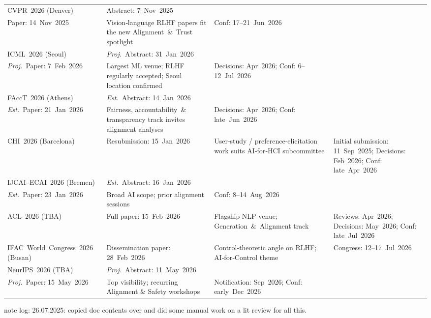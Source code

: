 \documentclass[sigconf]{acmart}
\begin{document}
\begin{table}[h]
\begin{adjustbox}{width=\linewidth}
\begin{tabular}{|p{3cm}|p{3.9cm}|p{5cm}|p{4.2cm}|}
CVPR 2026 (Denver) & Abstract: 7 Nov 2025\\Paper: 14 Nov 2025 & Vision‑language RLHF papers fit the new Alignment \& Trust spotlight & Conf: 17--21 Jun 2026 \\ \hline
ICML 2026 (Seoul) & \textit{Proj.}\ Abstract: 31 Jan 2026\\\textit{Proj.}\ Paper: 7 Feb 2026 & Largest ML venue; RLHF regularly accepted; Seoul location confirmed & Decisions: Apr 2026; Conf: 6--12 Jul 2026 \\ \hline
FAccT 2026 (Athens) & \textit{Est.}\ Abstract: 14 Jan 2026\\\textit{Est.}\ Paper: 21 Jan 2026 & Fairness, accountability \& transparency track invites alignment analyses & Decisions: Apr 2026; Conf: late Jun 2026 \\ \hline
CHI 2026 (Barcelona) & Resubmission: 15 Jan 2026 & User‑study / preference‑elicitation work suits AI‑for‑HCI subcommittee & Initial submission: 11 Sep 2025; Decisions: Feb 2026; Conf: late Apr 2026 \\ \hline
IJCAI--ECAI 2026 (Bremen) & \textit{Est.}\ Abstract: 16 Jan 2026\\\textit{Est.}\ Paper: 23 Jan 2026 & Broad AI scope; prior alignment sessions & Conf: 8--14 Aug 2026 \\ \hline
ACL 2026 (TBA) & Full paper: 15 Feb 2026 & Flagship NLP venue; Generation \& Alignment track & Reviews: Apr 2026; Decisions: May 2026; Conf: late Jul 2026 \\ \hline
IFAC World Congress 2026 (Busan) & Dissemination paper: 28 Feb 2026 & Control‑theoretic angle on RLHF; AI‑for‑Control theme & Congress: 12--17 Jul 2026 \\ \hline
NeurIPS 2026 (TBA) & \textit{Proj.}\ Abstract: 11 May 2026\\\textit{Proj.}\ Paper: 15 May 2026 & Top visibility; recurring Alignment \& Safety workshops & Notification: Sep 2026; Conf: early Dec 2026 \\ \hline
\end{tabular}
\end{adjustbox}
\end{table}





note log: 
26.07.2025: copied doc contents over and did some manual work on a lit review for all this. 
\end{document}
